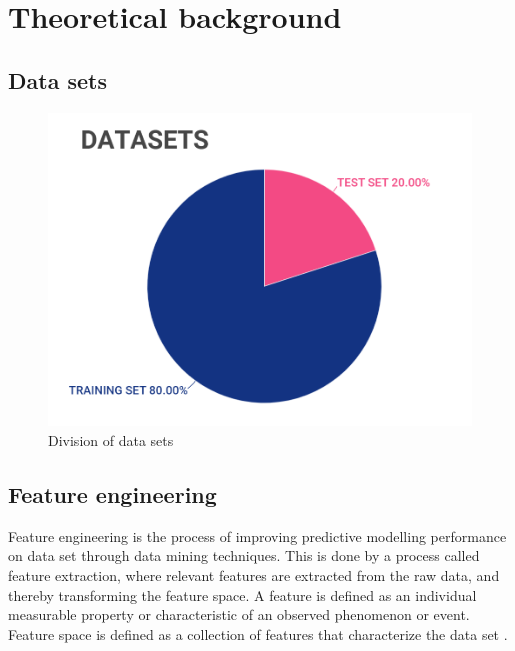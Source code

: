 \section{Theoretical background}
\label{sec:background}

\subsection{Data sets}
\label{subsec:Datasets}

\begin{figure}[h!]
\centering
\includegraphics[scale=0.45]{Images/2_theory/datasets.PNG}
\caption{Division of data sets}
\label{fig:datasets}
\end{figure}

\subsection{Feature engineering}
\label{subsec:feature_eng}
Feature engineering is the process of improving predictive modelling performance on data set through data mining techniques. This is done by a process called feature extraction, where relevant features are extracted from the raw data, and thereby transforming the feature space. A feature is defined as an individual measurable property or characteristic of an observed phenomenon or event. Feature space is defined as a collection of features that characterize the data set \cite{Bishop}.

